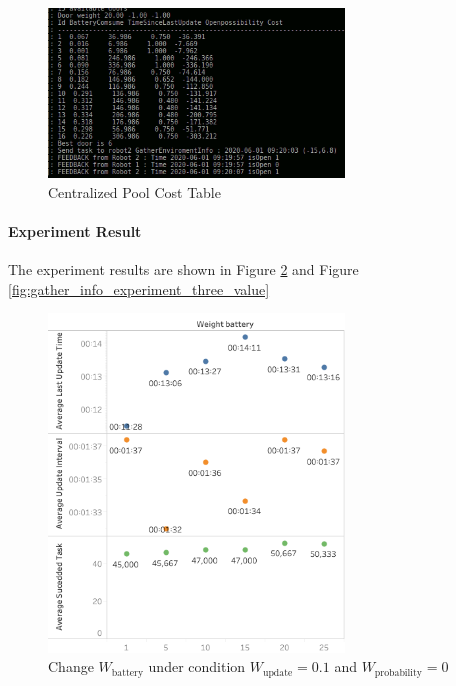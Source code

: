 \begin{figure}[htbp]
 \centering
 \includegraphics[width = 0.7\textwidth]{content/images/ch5/weight_analyze.png}
 \caption{Centralized Pool Cost Table}
 \label{fig:cost_table}
\end{figure}

\paragraph{Experiment Result} The experiment results are shown in Figure \ref{fig:gather_info_experiment_two_value} and Figure \ref{fig:gather_info_experiment_three_value}
\begin{figure}[htbp]
 \centering
 \includegraphics[width = 0.7\textwidth]{content/images/ch5/gather_info_change_weight_battery_only.png}
 \caption{ Change $W_{\mbox{battery}}$ under condition $W_{\mbox{update}} = 0.1$ and $W_{\mbox{probability}}=0$}
 \label{fig:gather_info_experiment_two_value}
\end{figure}

